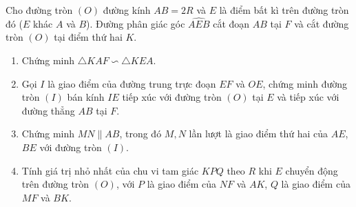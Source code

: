 \begin{ex}%
 Cho đường tròn $(O)$ đường kính $AB=2R$ và $E$ là điểm bất kì trên đường tròn đó ($E$ khác $A$ và $B$). Đường phân giác góc $\widehat{AEB}$ cắt đoạn $AB$ tại $F$ và cắt đường tròn $(O)$ tại điểm thứ hai $K$.
 \begin{enumerate}
  \item Chứng minh  $\triangle KAF \backsim \triangle KEA$.
  \item Gọi $I$ là giao điểm của đường trung trực đoạn $EF$ và $OE$, chứng minh đường tròn $(I)$ bán kính $IE$ tiếp xúc với đường tròn $(O)$ tại $E$ và tiếp xúc với đường thẳng $AB$ tại $F$.
  \item Chứng minh $MN \parallel AB$, trong đó $M, N$ lần lượt là giao điểm thứ hai của $AE$, $BE$ với đường tròn $(I)$.
  \item Tính giá trị nhỏ nhất của chu vi tam giác $KPQ$ theo $R$ khi $E$ chuyển động trên đường tròn $(O)$, với $P$ là 	giao điểm của $NF$ và $AK$, $Q$ là giao điểm của $MF$ và $BK$.
 \end{enumerate}
 \loigiai
  {
  \begin{center}

\end{center}}
\end{ex}
